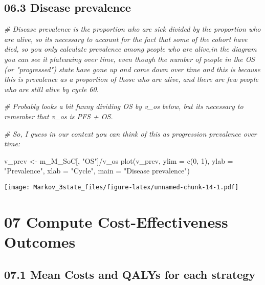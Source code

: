 \documentclass[
]{article}
\newenvironment{Shaded}{\begin{snugshade}}{\end{snugshade}}
\newcommand{\AttributeTok}[1]{\textcolor[rgb]{0.77,0.63,0.00}{#1}}
\newcommand{\CommentTok}[1]{\textcolor[rgb]{0.56,0.35,0.01}{\textit{#1}}}
\newcommand{\DecValTok}[1]{\textcolor[rgb]{0.00,0.00,0.81}{#1}}
\newcommand{\FunctionTok}[1]{\textcolor[rgb]{0.00,0.00,0.00}{#1}}
\newcommand{\NormalTok}[1]{#1}
\newcommand{\OtherTok}[1]{\textcolor[rgb]{0.56,0.35,0.01}{#1}}
\newcommand{\SpecialCharTok}[1]{\textcolor[rgb]{0.00,0.00,0.00}{#1}}
\newcommand{\StringTok}[1]{\textcolor[rgb]{0.31,0.60,0.02}{#1}}
\begin{document}
\hypertarget{disease-prevalence}{%
\subsection{06.3 Disease prevalence}\label{disease-prevalence}}

\begin{Shaded}
\begin{Highlighting}[]
\CommentTok{\# Disease prevalence is the proportion who are sick divided by the proportion who are alive, so it\textquotesingle{}s necessary to account for the fact that some of the cohort have died, so you only calculate prevalence among people who are alive,in the diagram you can see it plateauing over time, even though the number of people in the OS (or "progressed") state have gone up and come down over time and this is because this is prevalence as a proportion of those who are alive, and there are few people who are still alive by cycle 60.}

\CommentTok{\# Probably looks a bit funny dividing OS by v\_os below, but it\textquotesingle{}s necessary to remember that v\_os is PFS + OS.}

\CommentTok{\# So, I guess in our context you can think of this as progression prevalence over time:}

\NormalTok{v\_prev }\OtherTok{\textless{}{-}}\NormalTok{ m\_M\_SoC[, }\StringTok{"OS"}\NormalTok{]}\SpecialCharTok{/}\NormalTok{v\_os}
\FunctionTok{plot}\NormalTok{(v\_prev,}
     \AttributeTok{ylim =} \FunctionTok{c}\NormalTok{(}\DecValTok{0}\NormalTok{, }\DecValTok{1}\NormalTok{),}
     \AttributeTok{ylab =} \StringTok{"Prevalence"}\NormalTok{,}
     \AttributeTok{xlab =} \StringTok{"Cycle"}\NormalTok{,}
     \AttributeTok{main =} \StringTok{"Disease prevalence"}\NormalTok{)}
\end{Highlighting}
\end{Shaded}

\texttt{[image: Markov\_3state\_files/figure-latex/unnamed-chunk-14-1.pdf]}

\hypertarget{compute-cost-effectiveness-outcomes}{%
\section{07 Compute Cost-Effectiveness
Outcomes}\label{compute-cost-effectiveness-outcomes}}

\hypertarget{mean-costs-and-qalys-for-each-strategy}{%
\subsection{07.1 Mean Costs and QALYs for each
strategy}\label{mean-costs-and-qalys-for-each-strategy}}
\end{document}
